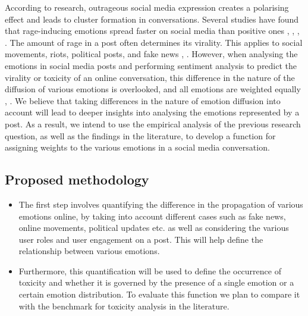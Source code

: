 According to research, outrageous social media expression creates a polarising effect and leads to cluster formation in conversations. Several studies have found that rage-inducing emotions spread faster on social media than positive ones \cite{bacaksizlar2019understanding}, \cite{steinert2022emotions}, \cite{chuai2020anger}, \cite{yi2022depicting}. The amount of rage in a post often determines its virality. This applies to social movements, riots, political posts, and fake news \cite{solovev2022moral}, \cite{mirbabaie2021development}. However, when analysing the emotions in social media posts and performing sentiment analysis to predict the virality or toxicity of an online conversation, this difference in the nature of the diffusion of various emotions is overlooked, and all emotions are weighted equally \cite{yue2019survey}, \cite{nemes2021social}. We believe that taking differences in the nature of emotion diffusion into account will lead to deeper insights into analysing the emotions represented by a post. As a result, we intend to use the empirical analysis of the previous research question, as well as the findings in the literature, to develop a function for assigning weights to the various emotions in a social media conversation.
\subsection{Proposed methodology}
\begin{itemize}
    \item The first step involves quantifying the difference in the propagation of various emotions online, by taking into account different cases such as fake news, online movements, political updates etc. as well as considering the various user roles and user engagement on a post. This will help define the relationship between various emotions.
    \item Furthermore, this quantification will be used to define the occurrence of toxicity and whether it is governed by the presence of a single emotion or a certain emotion distribution. To evaluate this function we plan to compare it with the benchmark for toxicity analysis in the literature.
\end{itemize}
